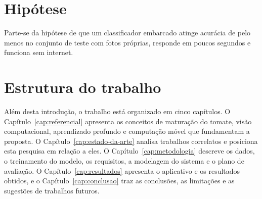 \section{Hipótese}

Parte-se da hipótese de que um classificador embarcado atinge acurácia de pelo menos  no conjunto de teste com fotos próprias, responde em poucos segundos e funciona sem internet.

\section{Estrutura do trabalho}

Além desta introdução, o trabalho está organizado em cinco capítulos. O Capítulo~\ref{cap:referencial} apresenta os conceitos de maturação do tomate, visão computacional, aprendizado profundo e computação móvel que fundamentam a proposta. O Capítulo~\ref{cap:estado-da-arte} analisa trabalhos correlatos e posiciona esta pesquisa em relação a eles. O Capítulo~\ref{cap:metodologia} descreve os dados, o treinamento do modelo, os requisitos, a modelagem do sistema e o plano de avaliação. O Capítulo~\ref{cap:resultados} apresenta o aplicativo e os resultados obtidos, e o Capítulo~\ref{cap:conclusao} traz as conclusões, as limitações e as sugestões de trabalhos futuros.
